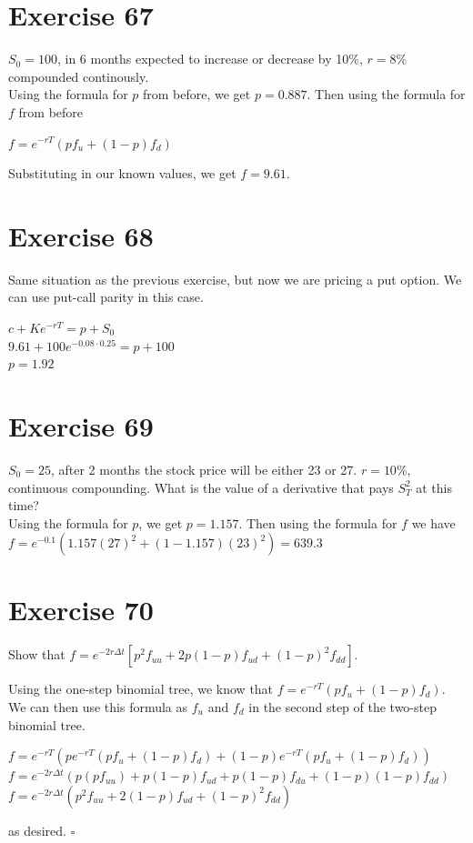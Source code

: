 \documentclass{article}
\begin{document}
\section*{Exercise 67}
\begin{flushleft}
    $S_0 = 100$, in 6 months expected to increase or decrease by 10\%, $r=8\%$ compounded continously. \\
    Using the formula for $p$ from before, we get $p = 0.887$. Then using the formula for $f$ from before
    \begin{center}
        $f = e^{-rT} (pf_u + (1-p)f_d)$
    \end{center}
    Substituting in our known values, we get $f = 9.61$.
\end{flushleft}

\section*{Exercise 68}
Same situation as the previous exercise, but now we are pricing a put option. We can use put-call parity in this case.
\begin{center}
    $c + Ke^{-rT} = p + S_0$ \\
    $9.61 + 100e^{-0.08 \cdot 0.25} = p + 100$ \\
    $p = 1.92$
\end{center}

\section*{Exercise 69}
\begin{flushleft}
    $S_0 = 25$, after 2 months the stock price will be either 23 or 27. $r=10\%$, continuous compounding. What is the value of a derivative that pays $S^{2}_T$ at this time? \\
    Using the formula for $p$, we get $p = 1.157$. Then using the formula for $f$ we have $f = e^{-0.1}(1.157(27)^2 + (1-1.157)(23)^2) = 639.3$
\end{flushleft}

\section*{Exercise 70}
Show that $f = e^{-2r\Delta t}[p^2f_{uu} + 2p(1-p)f_{ud} + (1-p)^2f_{dd}]$.
\begin{flushleft}
    Using the one-step binomial tree, we know that $f = e^{-rT} (pf_u + (1-p)f_d)$. We can then use this formula as $f_u$ and $f_d$ in the second step of the two-step binomial tree.
    \begin{center}
        $f = e^{-rT} (pe^{-rT} (pf_u + (1-p)f_d) + (1-p)e^{-rT} (pf_u + (1-p)f_d))$ \\
        $f = e^{-2r\Delta t}(p(pf_{uu}) + p(1-p)f_{ud} + p(1-p)f_{du} + (1-p)(1-p)f_{dd})$ \\
        $f = e^{-2r\Delta t} (p^2f_{uu} + 2(1-p)f_{ud} + (1-p)^2f_{dd})$
    \end{center}
    as desired. $\square$
\end{flushleft}
\end{document}
